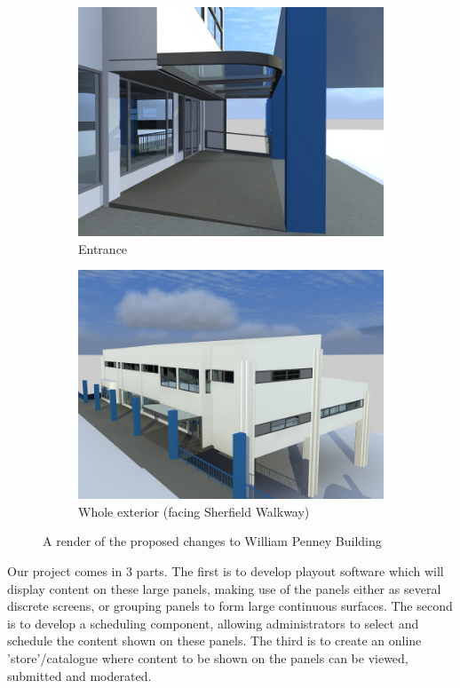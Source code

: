 \documentclass[a4paper, titlepage]{article}
\begin{document}
\begin{figure}[h!]
\centering
\begin{subfigure}{.5\textwidth}
  \centering
  \includegraphics[width=.9\linewidth]{./intro/Entrance.jpg}
  \caption{Entrance}
  \label{fig:sub1}
\end{subfigure}%
\begin{subfigure}{.5\textwidth}
  \centering
  \includegraphics[width=.9\linewidth]{./intro/External.jpg}
  \caption{Whole exterior (facing Sherfield Walkway)}
  \label{fig:sub2}
\end{subfigure}
\caption{A render of the proposed changes to William Penney Building}
\label{fig:intro_WPrender}
\end{figure}

Our project comes in 3 parts. The first is to develop playout software which will display content on these large panels, making use of the panels either as several discrete screens, or grouping panels to form large continuous surfaces. The second is to develop a scheduling component, allowing administrators to select and schedule the content shown on these panels. The third is to create an online 'store'/catalogue where content to be shown on the panels can be viewed, submitted and moderated.
\end{document}
